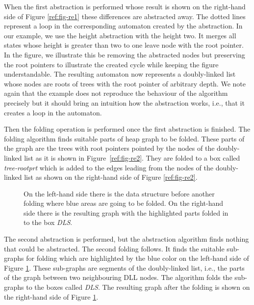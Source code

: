 {When the first abstraction is performed whose result is shown on the right-hand side
of Figure \ref{ref:fig-re1} these differences are abstracted away.
The dotted lines represent a loop in the corresponding automaton created by the abstraction.
In our example, we use the height abstraction with the height two.
It merges all states whose height is greater than two to one leave node with the root pointer.
In the figure, we illustrate this be removing the abstracted nodes but preserving the root pointers to illustrate
the created cycle while keeping the figure understandable.
The resulting automaton now represents a doubly-linked list
whose nodes are roots of trees with the root pointer of arbitrary depth.
We note again that the example does not reproduce the behaviour of the algorithm precisely but it should
bring an intuition how the abstraction works, i.e., that it creates a loop in the automaton.

Then the folding operation is performed once the first abstraction is finished.
The folding algorithm finds suitable parts of heap graph to be folded.
These parts of the graph are the trees with root pointers pointed by the nodes of the doubly-linked list as it is
shown in Figure~\ref{ref:fig-re2}.
They are folded to a box called \emph{tree-rootprt} which is
added to the edges leading from the nodes of the doubly-linked list as shown on the right-hand side of Figure \ref{ref:fig-re2}.

\begin{figure}[bt]
\begin{center}
\scalebox{.7} {
  \begin{subfigure}[b]{0.49\linewidth}
  \end{subfigure}
  \begin{subfigure}[b]{0.49\linewidth}
  \end{subfigure}
}
\end{center}
\caption{On the left-hand side there is the data structure before another folding where blue areas are going to be folded.
On the right-hand side there is the resulting graph with the highlighted parts folded in to the box \emph{DLS}.}
\label{ref:fig-re3}
\end{figure}

The second abstraction is performed, but the abstraction algorithm finds nothing that could be abstracted.
The second folding follows. It finds the suitable sub-graphs for folding which are highlighted by
the blue color on the left-hand side of Figure \ref{ref:fig-re3}.
These sub-graphs are segments of the doubly-linked list, i.e., the parts of the graph between two neighbouring DLL nodes.
The algorithm folds the sub-graphs to the boxes called \emph{DLS}.
The resulting graph after the folding is shown on the right-hand side of Figure \ref{ref:fig-re3}.

}
